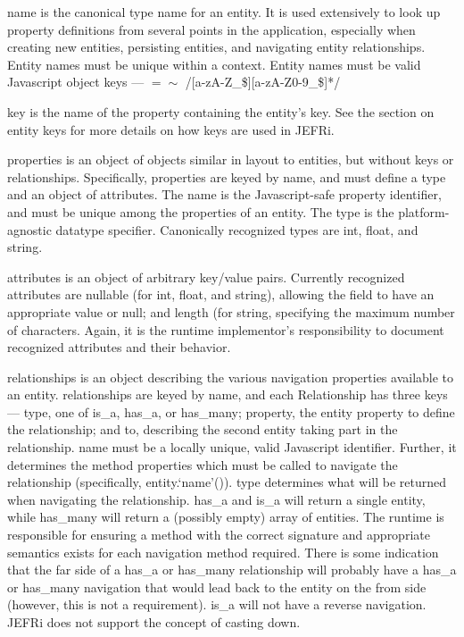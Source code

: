 \documentclass{article}
\renewcommand{\|}{\textbar}
\begin{document}
{\ilcode name} is the canonical type name for an entity. It is used extensively
to look up property definitions from several points in the application,
especially when creating new entities, persisting entities, and navigating
entity relationships. Entity names must be unique within a context. Entity names
must be valid Javascript object keys --- {\ilcode $=\sim$
/[a-zA-Z\_\$][a-zA-Z0-9\_\$]*/}

{\ilcode key} is the name of the property containing the entity's key. See the
section on entity keys for more details on how keys are used in JEFRi.

{\ilcode properties} is an object of objects similar in layout to entities, but
without keys or relationships. Specifically, properties are keyed by name, and
must define a type and an object of attributes. The name is the Javascript-safe
property identifier, and must be unique among the properties of an entity. The
type is the platform- agnostic datatype specifier. Canonically recognized types
are {\ilcode int}, {\ilcode float}, and {\ilcode string}.

{\ilcode attributes} is an object of arbitrary key/value pairs. Currently
recognized attributes are {\ilcode nullable} (for {\ilcode int}, {\ilcode
float}, and {\ilcode string}), allowing the field to have an appropriate value
or {\ilcode null}; and {\ilcode length} (for {\ilcode string}, specifying the
maximum number of characters. Again, it is the runtime implementor's
responsibility to document recognized attributes and their behavior.

{\ilcode relationships} is an object describing the various navigation
properties available to an entity. {\ilcode relationships} are keyed by name,
and each Relationship has three keys --- {\ilcode type}, one of {\ilcode is\_a},
{\ilcode has\_a}, or {\ilcode has\_many}; {\ilcode property}, the entity
property to define the relationship; and {\ilcode to}, describing the second
entity taking part in the relationship. {\ilcode name} must be a locally unique,
valid Javascript identifier. Further, it determines the method properties which
must be called to navigate the relationship (specifically, {\ilcode
entity.`name'()}). {\ilcode type} determines what will be returned when
navigating the relationship. {\ilcode has\_a} and {\ilcode is\_a} will return a
single entity, while {\ilcode has\_many} will return a (possibly empty) array of
entities. The runtime is responsible for ensuring a method with the correct
signature and appropriate semantics exists for each navigation method required.
There is some indication that the far side of a {\ilcode has\_a} or {\ilcode
has\_many} relationship will probably have a {\ilcode has\_a} or {\ilcode
has\_many} navigation that would lead back to the entity on the from side
(however, this is not a requirement). {\ilcode is\_a} will not have a reverse
navigation. JEFRi does not support the concept of casting down.
\end{document}
